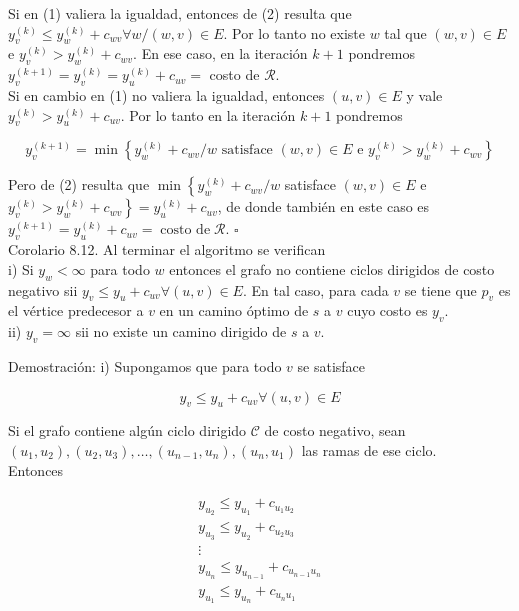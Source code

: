 \documentclass[10pt]{article}
\begin{document}
Si en (1) valiera la igualdad, entonces de (2) resulta que $y_{v}^{(k)} \leq y_{w}^{(k)}+c_{w v} \forall w /(w, v) \in E$. Por lo tanto no existe $w$ tal que $(w, v) \in E$ e $y_{v}^{(k)}>y_{w}^{(k)}+c_{w v}$. En ese caso, en la iteración $k+1$ pondremos $y_{v}^{(k+1)}=y_{v}^{(k)}=y_{u}^{(k)}+c_{u v}=$ costo de $\mathcal{R}$.\\
Si en cambio en (1) no valiera la igualdad, entonces $(u, v) \in E$ y vale $y_{v}^{(k)}>y_{u}^{(k)}+c_{u v}$. Por lo tanto en la iteración $k+1$ pondremos

$$
y_{v}^{(k+1)}=\min \left\{y_{w}^{(k)}+c_{w v} / w \text { satisface }(w, v) \in E \text { e } y_{v}^{(k)}>y_{w}^{(k)}+c_{w v}\right\}
$$

Pero de (2) resulta que $\min \left\{y_{w}^{(k)}+c_{w v} / w\right.$ satisface $(w, v) \in E$ e $\left.y_{v}^{(k)}>y_{w}^{(k)}+c_{w v}\right\}=y_{u}^{(k)}+c_{u v}$, de donde también en este caso es $y_{v}^{(k+1)}=y_{u}^{(k)}+c_{u v}=\operatorname{costo~de} \mathcal{R}$. $\square$\\
Corolario 8.12. Al terminar el algoritmo se verifican\\
i) Si $y_{w}<\infty$ para todo $w$ entonces el grafo no contiene ciclos dirigidos de costo negativo sii $y_{v} \leq y_{u}+c_{u v} \forall(u, v) \in E$. En tal caso, para cada $v$ se tiene que $p_{v}$ es el vértice predecesor a $v$ en un camino óptimo de $s$ a $v$ cuyo costo es $y_{v}$.\\
ii) $y_{v}=\infty$ sii no existe un camino dirigido de $s$ a $v$.

Demostración: i) Supongamos que para todo $v$ se satisface

$$
y_{v} \leq y_{u}+c_{u v} \forall(u, v) \in E
$$

Si el grafo contiene algún ciclo dirigido $\mathcal{C}$ de costo negativo, sean $\left(u_{1}, u_{2}\right),\left(u_{2}, u_{3}\right), \ldots,\left(u_{n-1}, u_{n}\right),\left(u_{n}, u_{1}\right)$ las ramas de ese ciclo.\\
Entonces

$$
\begin{gathered}
y_{u_{2}} \leq y_{u_{1}}+c_{u_{1} u_{2}} \\
y_{u_{3}} \leq y_{u_{2}}+c_{u_{2} u_{3}} \\
\vdots \\
y_{u_{n}} \leq y_{u_{n-1}}+c_{u_{n-1} u_{n}} \\
y_{u_{1}} \leq y_{u_{n}}+c_{u_{n} u_{1}}
\end{gathered}
$$
\end{document}
